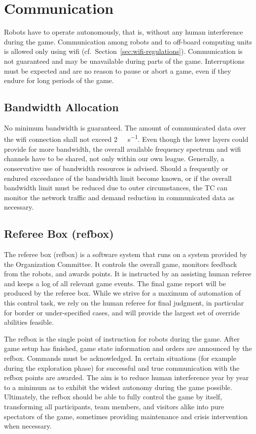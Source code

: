 \documentclass[12pt,twoside]{article}
\newcommand{\refsec}[1]{Section~\ref{#1}}
\begin{document}
\section{Communication}
\label{sec:communication}

Robots have to operate autonomously, that is, without any human
interference during the game. Communication among robots and to
off-board computing units is allowed only using wifi
(cf.~\refsec{sec:wifi-regulations}). Communication is not guaranteed
and may be unavailable during parts of the game. Interruptions must be
expected and are no reason to pause or abort a game, even if they
endure for long periods of the game.

\subsection{Bandwidth Allocation}
\label{sec:bandwidth}
No minimum bandwidth is guaranteed. The amount of communicated data
over the wifi connection shall not exceed
\SI[per-mode=symbol]{2}{\mega\bit\per\second}. Even though the lower
layers could provide for more bandwidth, the overall available
frequency spectrum and wifi channels have to be shared, not only
within our own league. Generally, a conservative use of bandwidth
resources is advised. Should a frequently or endured exceedance of the
bandwidth limit become known, or if the overall bandwidth limit must
be reduced due to outer circumstances, the TC can monitor the network
traffic and demand reduction in communicated data as necessary.

\subsection{Referee Box (refbox)}
\label{sec:referee-box}
The referee box (refbox) is a software system that runs on a system
provided by the Organization Committee. It controls the overall game,
monitors feedback from the robots, and awards points. It is instructed
by an assisting human referee and keeps a log of all relevant game
events. The final game report will be produced by the referee
box. While we strive for a maximum of automation of this control task,
we rely on the human referee for final judgment, in particular for
border or under-specified cases, and will provide the largest set of
override abilities feasible.

The refbox is the single point of instruction for robots during the
game. After game setup has finished, game state information and orders
are announced by the refbox. Commands must be acknowledged. In certain
situations (for example during the exploration phase) for successful
and true communication with the refbox points are awarded. The aim is
to reduce human interference year by year to a minimum as to exhibit
the widest autonomy during the game possible. Ultimately, the refbox
should be able to fully control the game by itself, transforming all
participants, team members, and visitors alike into pure spectators of
the game, sometimes providing maintenance and crisis intervention when
necessary.
\end{document}

